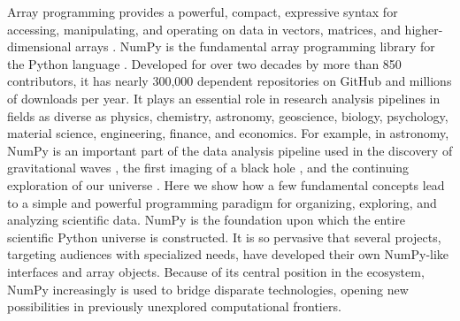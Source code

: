 




Array programming provides a powerful, compact, expressive syntax for accessing,
manipulating, and operating on data in vectors, matrices, and
higher-dimensional arrays \cite{iverson1980notation}.
NumPy is the fundamental array programming library for the Python language
\cite{dubois2007guest,oliphant2007python,millman2011python,perez2011python}.
Developed for over two decades by more than 850 contributors, 
it has nearly 300,000 dependent repositories on GitHub and millions of
downloads per year.
It plays an essential role in research analysis pipelines in fields as
diverse as physics, chemistry, astronomy, geoscience, biology, psychology,
material science, engineering, finance, and economics.
For example, in astronomy, NumPy is an important part of the data analysis
pipeline used in the discovery of gravitational
waves \cite{abbott2016observation}, the first imaging of a black hole \cite{eht-imaging}, and
the continuing exploration of our universe \cite{jenness2018lsst}.
Here we show how a few fundamental concepts lead to a simple and
powerful programming paradigm for organizing, exploring, and analyzing
scientific data.
NumPy is the foundation upon which the entire scientific Python
universe is constructed. It is so pervasive that several projects,
targeting audiences with specialized needs, have developed their own
NumPy-like interfaces and array objects.  Because of its central position in the
ecosystem, NumPy increasingly is used to bridge disparate
technologies, opening new possibilities in previously unexplored computational frontiers.

